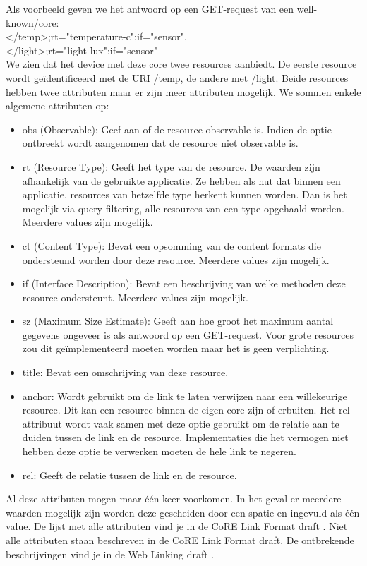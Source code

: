 \noindent
Als voorbeeld geven we het antwoord op een GET-request van een well-known/core:\\
\textless/temp\textgreater;rt="temperature-c";if="sensor",\\
\textless/light\textgreater;rt="light-lux";if="sensor"\\
We zien dat het device met deze core twee resources aanbiedt. De eerste resource wordt ge\"{i}dentificeerd met de URI /temp, de andere met /light. Beide resources hebben twee attributen maar er zijn meer attributen mogelijk. We sommen enkele algemene attributen op:
\begin{itemize}
\item obs (Observable): Geef aan of de resource observable is. Indien de optie ontbreekt wordt aangenomen dat de resource niet observable is.
\item rt (Resource Type): Geeft het type van de resource. De waarden zijn afhankelijk van de gebruikte applicatie. Ze hebben als nut dat binnen een applicatie, resources van hetzelfde type herkent kunnen worden. Dan is het mogelijk via query filtering, alle resources van een type opgehaald worden. Meerdere values zijn mogelijk.
\item ct (Content Type): Bevat een opsomming van de content formats die ondersteund worden door deze resource. Meerdere values zijn mogelijk.
\item if (Interface Description): Bevat een beschrijving van welke methoden deze resource ondersteunt. Meerdere values zijn mogelijk.
\item sz (Maximum Size Estimate): Geeft aan hoe groot het maximum aantal gegevens ongeveer is als antwoord op een GET-request. Voor grote resources zou dit ge\"{i}mplementeerd moeten worden maar het is geen verplichting.
\item title: Bevat een omschrijving van deze resource.
\item anchor: Wordt gebruikt om de link te laten verwijzen naar een willekeurige resource. Dit kan een resource binnen de eigen core zijn of erbuiten. Het rel-attribuut wordt vaak samen met deze optie gebruikt om de relatie aan te duiden tussen de link en de resource. Implementaties die het vermogen niet hebben deze optie te verwerken moeten de hele link te negeren.
\item rel: Geeft de relatie tussen de link en de resource.
\end{itemize}
Al deze attributen mogen maar \'{e}\'{e}n keer voorkomen. In het geval er meerdere waarden mogelijk zijn worden deze gescheiden door een spatie en ingevuld als \'{e}\'{e}n value. De lijst met alle attributen vind je in de CoRE Link Format draft \cite{coapDiscovery}. Niet alle attributen staan beschreven in de CoRE Link Format draft. De ontbrekende beschrijvingen vind je in de Web Linking draft \cite{webLinking}.

